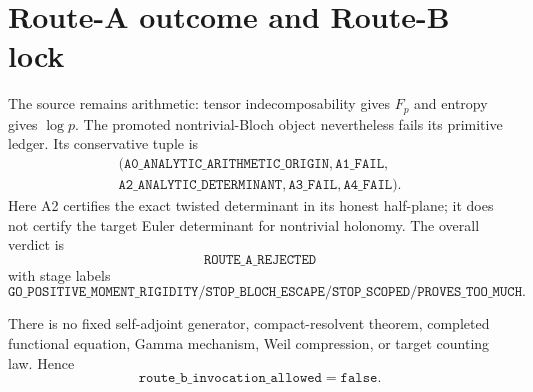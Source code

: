 \section{Route-A outcome and Route-B lock}
\label{sec:route}

The source remains arithmetic: tensor indecomposability gives $F_p$ and
entropy gives $\log p$.  The promoted nontrivial-Bloch object nevertheless
fails its primitive ledger.  Its conservative tuple is
\[
\begin{gathered}
 (\texttt{A0\_ANALYTIC\_ARITHMETIC\_ORIGIN},\texttt{A1\_FAIL},\\
 \texttt{A2\_ANALYTIC\_DETERMINANT},\texttt{A3\_FAIL},
 \texttt{A4\_FAIL}).
\end{gathered}                                               \tag{7.1}
\]
Here A2 certifies the exact twisted determinant in its honest half-plane; it
does not certify the target Euler determinant for nontrivial holonomy.  The
overall verdict is
\[
 \boxed{\texttt{ROUTE\_A\_REJECTED}}                         \tag{7.2}
\]
with stage labels
\[
 \texttt{GO\_POSITIVE\_MOMENT\_RIGIDITY}/
 \texttt{STOP\_BLOCH\_ESCAPE}/
 \texttt{STOP\_SCOPED}/\texttt{PROVES\_TOO\_MUCH}.          \tag{7.3}
\]

There is no fixed self-adjoint generator, compact-resolvent theorem,
completed functional equation, Gamma mechanism, Weil compression, or target
counting law.  Hence
\[
 \mathtt{route\_b\_invocation\_allowed=false}.              \tag{7.4}
\]
